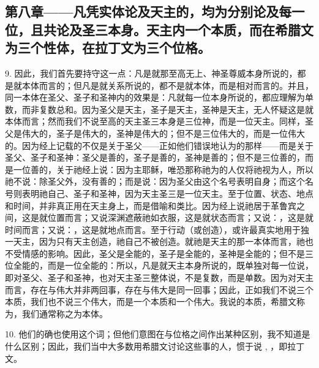 
\subsection{第八章——凡凭实体论及天主的，均为分别论及每一位，且共论及圣三本身。天主内一个本质，而在希腊文为三个性体，在拉丁文为三个位格。}

9. 因此，我们首先要持守这一点：凡是就那至高无上、神圣尊威本身所说的，都是就本体而言的；但凡是就关系所说的，都不是就本体，而是相对而言的。并且，同一本体在圣父、圣子和圣神内的效果是：凡就每一位本身所说的，都应理解为单数，而非复数总和。因为圣父是天主，圣子是天主，圣神是天主，无人怀疑这是就本体而言；然而我们不说至高的天主圣三本身是三位神，而是一位天主。同样，圣父是伟大的，圣子是伟大的，圣神是伟大的；但不是三位伟大的，而是一位伟大的。因为经上记载的不仅是关于圣父——正如他们错误地认为的那样——而是关于圣父、圣子和圣神：圣父是善的，圣子是善的，圣神是善的；但不是三位善的，而是一位善的，关于祂经上说：因为主耶稣，唯恐那称祂为的人仅将祂视为人，所以祂不说：除圣父外，没有善的；而是说：因为圣父由这个名号表明自身；而这个名号则表明祂自己、圣子和圣神，因为天主圣三是一位天主。至于位置、状态、地点和时间，并非真正用在天主身上，而是借喻和类比。因为经上说祂居于革鲁宾之间，这是就位置而言；又说深渊遮蔽祂如衣服，这是就状态而言；又说：，这是就时间而言；又说：，这是就地点而言。至于行动（或创造），或许最真实地用于独一天主，因为只有天主创造，祂自己不被创造。就祂是天主的那一本体而言，祂也不受情感的影响。因此，圣父是全能的，圣子是全能的，圣神是全能的；但不是三位全能的，而是一位全能的：所以，凡是就天主本身所说的，既单独对每一位说，即对圣父、圣子和圣神，也对天主圣三整体说，不是复数，而是单数。因为对天主而言，存在与伟大并非两回事，存在与伟大是同一回事；因此，正如我们不说三个本质，我们也不说三个伟大，而是一个本质和一个伟大。我说的本质，希腊文称为，我们通常称之为本体。\par

10. 他们的确也使用这个词；但他们意图在与位格之间作出某种区别，我不知道是什么区别；因此，我们当中大多数用希腊文讨论这些事的人，惯于说 ,  ，即拉丁文。\par

